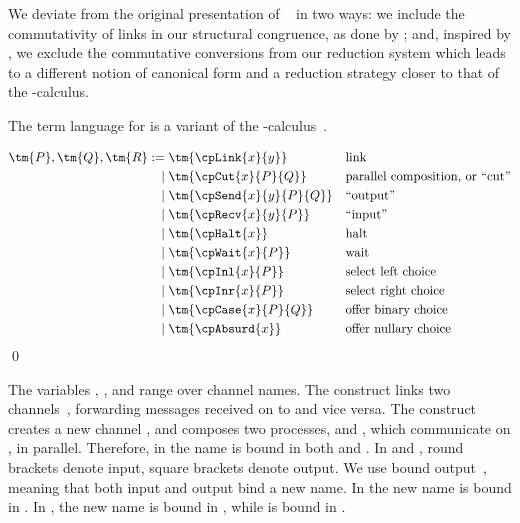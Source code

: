 \documentclass[UKenglish]{llncs}
\begin{document}
We deviate from the original presentation of \cp~\cite{wadler2012} in two ways:
we include the commutativity of links in our structural congruence, as done by
; and, inspired by , we
exclude the commutative conversions from our reduction system which leads to a 
different notion of canonical form and a reduction strategy closer to that of
the \textpi-calculus.

The term language for \cp is a variant of the
\textpi-calculus~\cite{milner1992b}.
\begin{definition}[Terms]\label{def:cp-terms}
  \[\!
    \begin{aligned}
      \tm{P}, \tm{Q}, \tm{R}
           :=& \; \tm{\cpLink{x}{y}}       &&\text{link}
      \\ \mid& \; \tm{\cpCut{x}{P}{Q}}     &&\text{parallel composition, or ``cut''}
      \\ \mid& \; \tm{\cpSend{x}{y}{P}{Q}} &&\text{``output''}
      \\ \mid& \; \tm{\cpRecv{x}{y}{P}}    &&\text{``input''}
      \\ \mid& \; \tm{\cpHalt{x}}          &&\text{halt}
      \\ \mid& \; \tm{\cpWait{x}{P}}       &&\text{wait}
      \\ \mid& \; \tm{\cpInl{x}{P}}        &&\text{select left choice}
      \\ \mid& \; \tm{\cpInr{x}{P}}        &&\text{select right choice}
      \\ \mid& \; \tm{\cpCase{x}{P}{Q}}    &&\text{offer binary choice}
      \\ \mid& \; \tm{\cpAbsurd{x}}        &&\text{offer nullary choice}
    \end{aligned}
  \]  
  \qed
\end{definition}
The variables , ,  and  range over channel names.
The construct  links two
channels~\cite{sangiorgi1996,boreale1998}, forwarding messages received on
 to  and vice versa.
The construct  creates a new channel , and composes
two processes,  and , which communicate on , in parallel.
Therefore, in  the name  is bound in both  and
.
In  and , round brackets denote
input, square brackets denote output. 
We use bound output~\cite{sangiorgi1996}, meaning that both input and output
bind a new name. 
In  the new name  is bound in .
In , the new name  is bound in , while
 is bound in .
\end{document}
